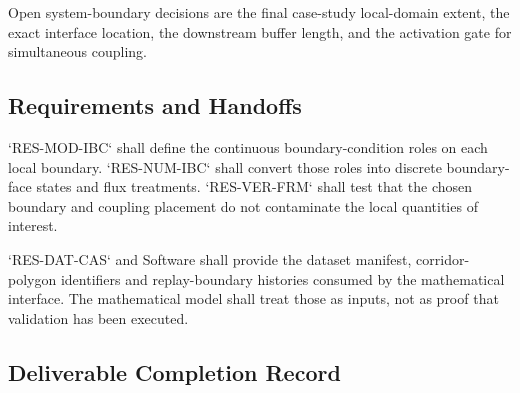 Open system-boundary decisions are the final case-study local-domain
extent, the exact interface location, the downstream buffer length, and
the activation gate for simultaneous coupling.

\subsection{Requirements and Handoffs}
\label{sec:res-mod-sys-requirements}


`RES-MOD-IBC` shall define the continuous boundary-condition roles on
each local boundary. `RES-NUM-IBC` shall convert those roles into
discrete boundary-face states and flux treatments. `RES-VER-FRM` shall
test that the chosen boundary and coupling placement do not contaminate
the local quantities of interest.

`RES-DAT-CAS` and Software shall provide the dataset manifest,
corridor-polygon identifiers and replay-boundary histories consumed by
the mathematical interface. The mathematical model shall treat those as
inputs, not as proof that validation has been executed.

\subsection{Deliverable Completion Record}
\label{sec:res-mod-sys-completion-record}

%
%
%
